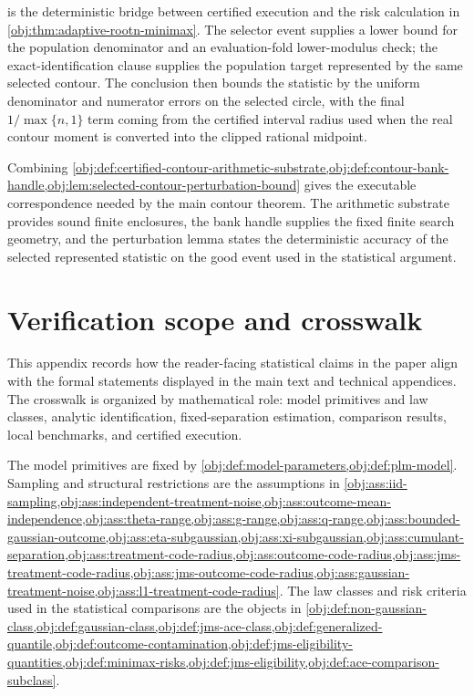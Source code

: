 \documentclass[11pt]{article}
\begin{document}
 is the deterministic bridge between certified execution and the risk calculation in \cref{obj:thm:adaptive-rootn-minimax}. The selector event supplies a lower bound for the population denominator and an evaluation-fold lower-modulus check; the exact-identification clause supplies the population target represented by the same selected contour. The conclusion then bounds the statistic by the uniform denominator and numerator errors on the selected circle, with the final \(1/\max\{n,1\}\) term coming from the certified interval radius used when the real contour moment is converted into the clipped rational midpoint.

Combining \cref{obj:def:certified-contour-arithmetic-substrate,obj:def:contour-bank-handle,obj:lem:selected-contour-perturbation-bound} gives the executable correspondence needed by the main contour theorem. The arithmetic substrate provides sound finite enclosures, the bank handle supplies the fixed finite search geometry, and the perturbation lemma states the deterministic accuracy of the selected represented statistic on the good event used in the statistical argument.


\section{Verification scope and crosswalk}

This appendix records how the reader-facing statistical claims in the paper align with the formal statements displayed in the main text and technical appendices. The crosswalk is organized by mathematical role: model primitives and law classes, analytic identification, fixed-separation estimation, comparison results, local benchmarks, and certified execution.

The model primitives are fixed by \cref{obj:def:model-parameters,obj:def:plm-model}. Sampling and structural restrictions are the assumptions in \cref{obj:ass:iid-sampling,obj:ass:independent-treatment-noise,obj:ass:outcome-mean-independence,obj:ass:theta-range,obj:ass:g-range,obj:ass:q-range,obj:ass:bounded-gaussian-outcome,obj:ass:eta-subgaussian,obj:ass:xi-subgaussian,obj:ass:cumulant-separation,obj:ass:treatment-code-radius,obj:ass:outcome-code-radius,obj:ass:jms-treatment-code-radius,obj:ass:jms-outcome-code-radius,obj:ass:gaussian-treatment-noise,obj:ass:l1-treatment-code-radius}. The law classes and risk criteria used in the statistical comparisons are the objects in \cref{obj:def:non-gaussian-class,obj:def:gaussian-class,obj:def:jms-ace-class,obj:def:generalized-quantile,obj:def:outcome-contamination,obj:def:jms-eligibility-quantities,obj:def:minimax-risks,obj:def:jms-eligibility,obj:def:ace-comparison-subclass}.
\end{document}
